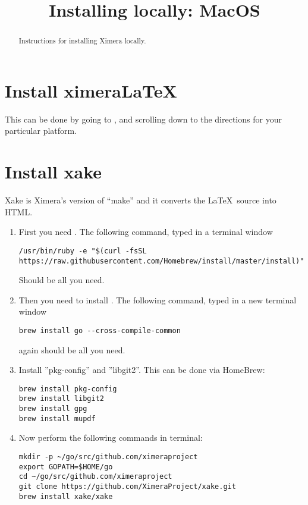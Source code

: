 \documentclass{ximera}
\title{Installing locally: MacOS}
\begin{document}
\begin{abstract}
Instructions for installing Ximera locally.
\end{abstract}
\maketitle


\section{Install ximeraLaTeX}

This can be done by going to , and scrolling
down to the directions for your particular platform.




\section{Install xake}

Xake is Ximera's version of ``make'' and it converts the
\LaTeX\ source into HTML.

\begin{enumerate}
\item First you need . The following command, typed in a terminal window
\begin{verbatim}
/usr/bin/ruby -e "$(curl -fsSL https://raw.githubusercontent.com/Homebrew/install/master/install)"
\end{verbatim}
Should be all you need. 
\item Then you need to install . The following command, typed in a new terminal window
\begin{verbatim}
brew install go --cross-compile-common
\end{verbatim}
again should be all you need.
\item Install ''pkg-config” and ''libgit2”. This can be done via HomeBrew:
\begin{verbatim}
brew install pkg-config
brew install libgit2
brew install gpg
brew install mupdf
\end{verbatim}
\item Now perform the following commands in terminal:
\begin{verbatim}
mkdir -p ~/go/src/github.com/ximeraproject
export GOPATH=$HOME/go
cd ~/go/src/github.com/ximeraproject
git clone https://github.com/XimeraProject/xake.git
brew install xake/xake
\end{verbatim}
\end{enumerate}
\end{document}
